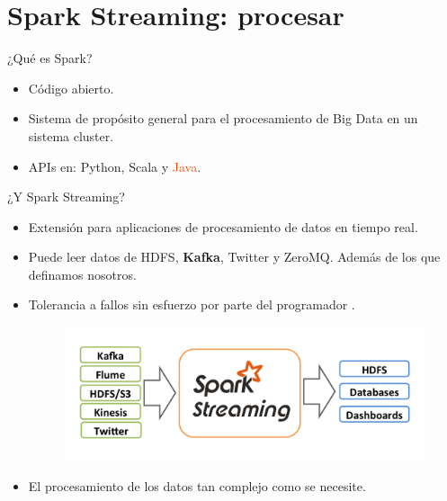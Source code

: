 \documentclass[dvipsnames]{beamer}
\begin{document}
	\section{Spark Streaming: procesar}
	
	\begin{frame}
          ¿Qué es Spark?
          \begin{itemize}
          \item Código abierto.
          \item Sistema de propósito general para el procesamiento de Big Data en un sistema cluster.
          \item APIs en: \textcolor{deepBlue}{Python}, \textcolor{deepRed}{Scala} y \textcolor{orangeRed}{Java}.
          \end{itemize}
	\end{frame}	
	
	\begin{frame}
          ¿Y Spark Streaming?
          \begin{itemize}
          \item Extensión para aplicaciones de procesamiento de datos en tiempo real.
          \item Puede leer datos de HDFS, \textbf{Kafka}, Twitter y ZeroMQ. Además de los que definamos nosotros.
          \item Tolerancia a fallos sin esfuerzo por parte del programador \Smiley.

            \begin{figure}[H]
              \centering
              \includegraphics[scale=0.4]{img/streaming-arch.png}
            \end{figure}

            
          \item El procesamiento de los datos tan complejo como se necesite.
          \end{itemize}          
	\end{frame}
\end{document}
